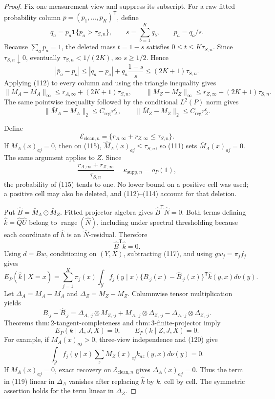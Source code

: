\documentclass{article}
\begin{document}
\begin{proof}
Fix one measurement view and suppress its subscript.  For a raw fitted probability column \(p=(p_1,\ldots,p_K)^{\mathsf T}\), define
\[
 q_a=p_a\mathbf 1\{p_a>\tau_{S,n}\},\qquad
 s=\sum_{b=1}^Kq_b,\qquad \bar p_a=q_a/s. \tag{111}
\]
Because \(\sum_ap_a=1\), the deleted mass \(t=1-s\) satisfies
\(0\leq t\leq K\tau_{S,n}\).  Since \(\tau_{S,n}\downarrow0\), eventually
\(\tau_{S,n}<1/(2K)\), so \(s\geq1/2\).  Hence
\[
 |\bar p_a-p_a|
 \leq|q_a-p_a|+q_a\frac{1-s}{s}
 \leq(2K+1)\tau_{S,n}. \tag{112}
\]
Applying (112) to every column and using the triangle inequality gives
\[
 \|\bar M_A-M_A\|_\infty
 \leq r_{A,\infty}+(2K+1)\tau_{S,n},\qquad
 \|\bar M_Z-M_Z\|_\infty
 \leq r_{Z,\infty}+(2K+1)\tau_{S,n}. \tag{113}
\]
The same pointwise inequality followed by the conditional \(L^2(P)\) norm gives
\[
 \|\bar M_A-M_A\|_2\leq C_{\mathrm{reg}}r_A^c,\qquad
 \|\bar M_Z-M_Z\|_2\leq C_{\mathrm{reg}}r_Z^c. \tag{114}
\]

Define
\[
 \mathcal E_{\mathrm{clean},n}
 =\{r_{A,\infty}+r_{Z,\infty}\leq\tau_{S,n}\}. \tag{115}
\]
If \(M_A(x)_{aj}=0\), then on (115),
\(\widehat M_A(x)_{aj}\leq\tau_{S,n}\), so (111) sets
\(\bar M_A(x)_{aj}=0\).  The same argument applies to \(Z\).  Since
\[
 \frac{r_{A,\infty}+r_{Z,\infty}}{\tau_{S,n}}
 =\kappa_{\mathrm{supp},n}=o_P(1), \tag{116}
\]
the probability of (115) tends to one.  No lower bound on a positive cell was used; a positive cell may also be deleted, and (112)--(114) account for that deletion.

Put \(\widehat B=\bar M_A\odot\bar M_Z\).  Fitted projector algebra gives
\(\widehat B^{\mathsf T}\widehat N=0\).  Both terms defining
\(\widehat k=\widehat Q\widehat U\) belong to \(\operatorname{range}(\widehat N)\), including under spectral thresholding because each coordinate of \(\widehat h\) is an \(\widehat N\)-residual.  Therefore
\[
 \widehat B^{\mathsf T}\widehat k=0. \tag{117}
\]
Using \(d=Bw\), conditioning on \((Y,X)\), subtracting (117), and using \(gw_j=\pi_jf_j\) gives
\[
 E_P(\widehat k\mid X=x)
 =\sum_{j=1}^K\pi_j(x)\int_{\mathcal Y}f_j(y\mid x)
 \{B_{\cdot j}(x)-\widehat B_{\cdot j}(x)\}^{\mathsf T}
 \widehat k(y,x)d\nu(y). \tag{118}
\]
Let \(\Delta_A=M_A-\bar M_A\) and \(\Delta_Z=M_Z-\bar M_Z\).  Columnwise tensor multiplication yields
\[
 B_{\cdot j}-\widehat B_{\cdot j}
 =\Delta_{A,\cdot j}\otimes M_{Z,\cdot j}
 +M_{A,\cdot j}\otimes\Delta_{Z,\cdot j}
 -\Delta_{A,\cdot j}\otimes\Delta_{Z,\cdot j}. \tag{119}
\]
Theorems \(\mathrm{thm{:}2\mbox{-}tangent\mbox{-}completeness}\) and
\(\mathrm{thm{:}3\mbox{-}finite\mbox{-}projector}\) imply
\[
 E_P(k\mid A,J,X)=0,\qquad E_P(k\mid Z,J,X)=0. \tag{120}
\]
For example, if \(M_A(x)_{aj}>0\), three-view independence and (120) give
\[
 \int_{\mathcal Y}f_j(y\mid x)
 \sum_zM_Z(x)_{zj}k_{az}(y,x)d\nu(y)=0. \tag{121}
\]
If \(M_A(x)_{aj}=0\), exact recovery on \(\mathcal E_{\mathrm{clean},n}\) gives
\(\Delta_A(x)_{aj}=0\).  Thus the term in (119) linear in \(\Delta_A\) vanishes after replacing \(\widehat k\) by \(k\), cell by cell.  The symmetric assertion holds for the term linear in \(\Delta_Z\).


\end{proof}
\end{document}

